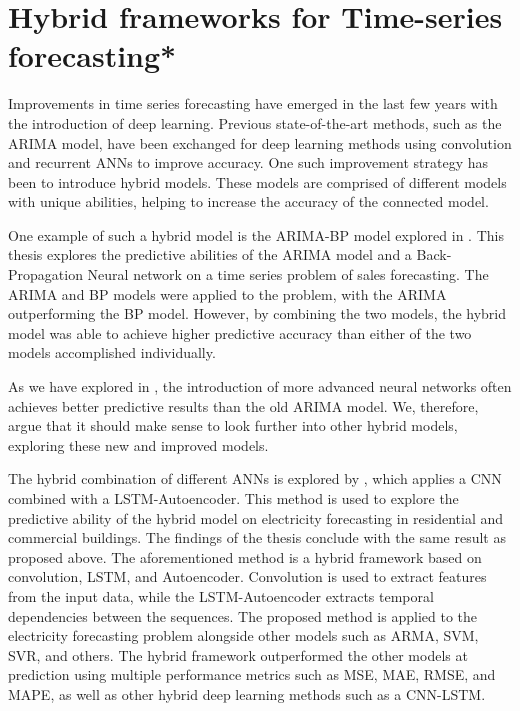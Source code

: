 \section{Hybrid frameworks for Time-series forecasting*}
\label{section:RelatedWork:Hybrid}

Improvements in time series forecasting have emerged in the last few years with the introduction of deep learning.
Previous state-of-the-art methods, such as the ARIMA model, have been exchanged for deep learning methods using convolution and recurrent ANNs to improve accuracy.
One such improvement strategy has been to introduce hybrid models.
These models are comprised of different models with unique abilities, helping to increase the accuracy of the connected model.


One example of such a hybrid model is the ARIMA-BP model explored in \cite{Bowen2020}.
This thesis explores the predictive abilities of the ARIMA model and a Back-Propagation Neural network on a time series problem of sales forecasting.
The ARIMA and BP models were applied to the problem, with the ARIMA outperforming the BP model.
However, by combining the two models, the hybrid model was able to achieve higher predictive accuracy than either of the two models accomplished individually.

As we have explored in , the introduction of more advanced neural networks often achieves better predictive results than the old ARIMA model.
We, therefore, argue that it should make sense to look further into other hybrid models, exploring these new and improved models.


The hybrid combination of different ANNs is explored by \cite{Khan2020}, which applies a CNN combined with a LSTM-Autoencoder.
This method is used to explore the predictive ability of the hybrid model on electricity forecasting in residential and commercial buildings.
The findings of the thesis conclude with the same result as proposed above.
The aforementioned method is a hybrid framework based on convolution, LSTM, and Autoencoder.
Convolution is used to extract features from the input data, while the LSTM-Autoencoder extracts temporal dependencies between the sequences.
The proposed method is applied to the electricity forecasting problem alongside other models such as ARMA, SVM, SVR, and others.
The hybrid framework outperformed the other models at prediction using multiple performance metrics such as MSE, MAE, RMSE, and MAPE,
as well as other hybrid deep learning methods such as a CNN-LSTM.


